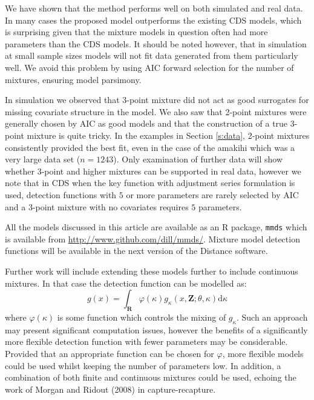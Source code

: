 \documentclass[useAMS,referee, usegraphicx]{biom}
\begin{document}
We have shown that the method performs well on both simulated and real data. In many cases the proposed model outperforms the existing CDS models, which is surprising given that the mixture models in question often had more parameters than the CDS models. It should be noted however, that in simulation at small sample sizes models will not fit data generated from them particularly well. We avoid this problem by using AIC forward selection for the number of mixtures, ensuring model parsimony.

In simulation we observed that 3-point mixture did not act as good surrogates for missing covariate structure in the model. We also saw that 2-point mixtures were generally chosen by AIC as good models and that the construction of a true 3-point mixture is quite tricky. In the examples in Section \ref{s:data}, 2-point mixtures consistently provided the best fit, even in the case of the amakihi which was a very large data set ($n=1243$). Only examination of further data will show whether 3-point and higher mixtures can be supported in real data, however we note that in CDS when the key function with adjustment series formulation is used, detection functions with $5$ or more parameters are rarely selected by AIC and a 3-point mixture with no covariates requires $5$ parameters.

All the models discussed in this article are available as an \textsf{R} package, \texttt{mmds} which is available from \url{http://www.github.com/dill/mmds/}. Mixture model detection functions will be available in the next version of the Distance software.

Further work will include extending these models further to include continuous mixtures. In that case the detection function can be modelled as:
\begin{equation*}
g(x) = \int_\mathbf{R} \varphi(\kappa) g_\kappa(x,\mathbf{Z}; \theta, \kappa) \text{d}\kappa
\end{equation*}
where $\varphi(\kappa)$ is some function which controls the mixing of $g_\kappa$. Such an approach may present significant computation issues, however the benefits of a significantly more flexible detection function with fewer parameters may be considerable. Provided that an appropriate function can be chosen for $\varphi$, more flexible models could be used whilst keeping the number of parameters low. In addition, a combination of both finite and continuous mixtures could be used, echoing the work of Morgan and Ridout (2008) in capture-recapture.
\end{document}
